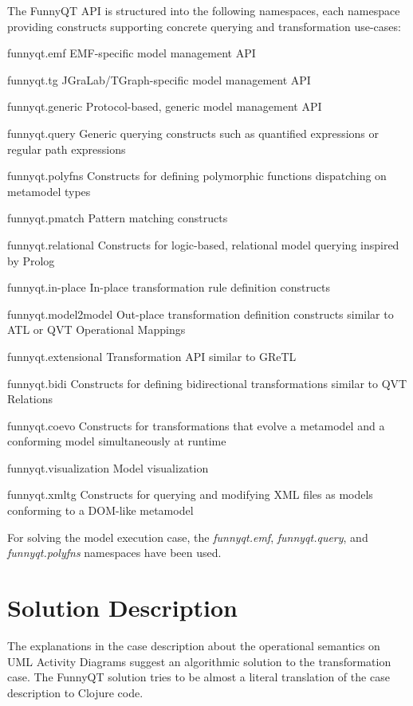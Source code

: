 \documentclass[submission]{eptcs}
\begin{document}
The FunnyQT API is structured into the following namespaces, each namespace
providing constructs supporting concrete querying and transformation use-cases:

\begin{compactdesc}
\item[funnyqt.emf] EMF-specific model management API
\item[funnyqt.tg] JGraLab/TGraph-specific model management API
\item[funnyqt.generic] Protocol-based, generic model management API
\item[funnyqt.query] Generic querying constructs such as quantified expressions
  or regular path expressions
\item[funnyqt.polyfns] Constructs for defining polymorphic functions
  dispatching on metamodel types
\item[funnyqt.pmatch] Pattern matching constructs
\item[funnyqt.relational] Constructs for logic-based, relational model querying
  inspired by Prolog
\item[funnyqt.in-place] In-place transformation rule definition constructs
\item[funnyqt.model2model] Out-place transformation definition constructs
  similar to ATL or QVT Operational Mappings
\item[funnyqt.extensional] Transformation API similar to GReTL
\item[funnyqt.bidi] Constructs for defining bidirectional transformations
  similar to QVT Relations
\item[funnyqt.coevo] Constructs for transformations that evolve a metamodel and
  a conforming model simultaneously at runtime
\item[funnyqt.visualization] Model visualization
\item[funnyqt.xmltg] Constructs for querying and modifying XML files as models
  conforming to a DOM-like metamodel
\end{compactdesc}

For solving the model execution case, the \emph{funnyqt.emf},
\emph{funnyqt.query}, and \emph{funnyqt.polyfns} namespaces have been used.


\section{Solution Description}
\label{sec:solution-description}

The explanations in the case description about the operational semantics on UML
Activity Diagrams suggest an algorithmic solution to the transformation case.
The FunnyQT solution tries to be almost a literal translation of the case
description to Clojure code.
\end{document}
